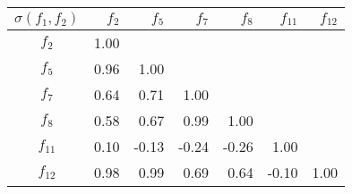 \centering
\label{table:correlations}
\begin{tabular}{@{}crrrrrr@{}}
\toprule
$\sigma(f_1,f_2)$ & ${f_2}$ & ${f_5}$ & ${f_7}$ & ${f_8}$ & ${f_{11}}$ & ${f_{12}}$ \\ \midrule 
${f_2}$      & 1.00    &         &         &         &            &            \\
${f_5}$      & 0.96    & 1.00    &         &         &            &            \\
${f_7}$      & 0.64    & 0.71    & 1.00    &         &            &            \\
${f_8}$      & 0.58    & 0.67    & 0.99    & 1.00    &            &            \\
${f_{11}}$   & 0.10    & -0.13   & -0.24   & -0.26   & 1.00       &            \\
${f_{12}}$   & 0.98    & 0.99    & 0.69    & 0.64    & -0.10      & 1.00       \\ \bottomrule
\end{tabular}%

